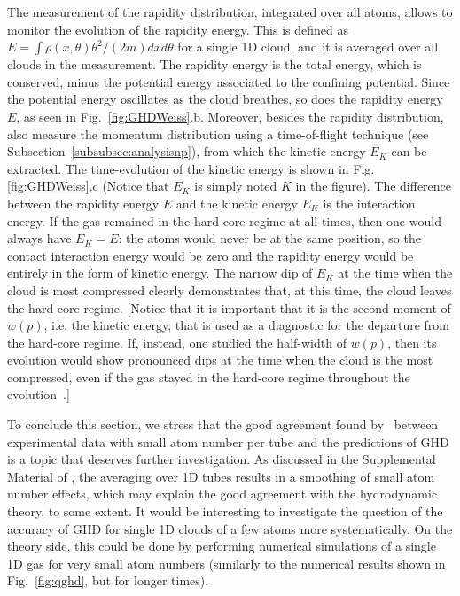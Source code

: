 \documentclass[onecolumn,amsfonts,showpacs,superscriptaddress]{revtex4-1}
\begin{document}
The measurement of the rapidity distribution, integrated over all atoms, allows to monitor the evolution of the rapidity energy. This is defined as $E= \int \rho(x,\theta) \theta^2/(2m) dx d\theta$ for a single 1D cloud, and it is averaged over all clouds in the measurement. The rapidity energy is the total energy, which is conserved, minus the potential energy associated to the confining potential. Since the potential energy oscillates as the cloud breathes, so does the rapidity energy $E$, as seen in Fig.~\ref{fig:GHDWeiss}.b.
Moreover, besides the rapidity distribution, \cite{malvania2020generalized} also measure the momentum distribution using a time-of-flight technique (see Subsection~\ref{subsubsec:analysisnp}), from which the kinetic energy $E_K$ can be extracted. The time-evolution of the kinetic energy is  shown in Fig.\ref{fig:GHDWeiss}.c %
(Notice that $E_K$ is simply noted $K$ in the figure).%
The difference between the rapidity energy $E$ and the kinetic energy $E_K$ is the interaction energy. If the gas remained in the hard-core regime at all times, then one would always have $E_K=E$: the atoms would never be at the same position, so the contact interaction energy would be zero and the rapidity energy would be entirely in the form of kinetic energy. The narrow dip of $E_K$ at the time when the cloud is most compressed clearly demonstrates that, at this time, the cloud leaves the hard core regime. [Notice that it is important that it is the second moment of $w(p)$, i.e. the kinetic energy, that is used as a diagnostic for the departure from the hard-core regime. If, instead, one studied the half-width of $w(p)$, then its evolution would show pronounced dips at the time when the cloud is the most compressed, even if the gas stayed in the hard-core regime throughout the evolution~\citep{atas_collective_2017}.]


To conclude this section, we stress that the good agreement found by~\citep{malvania2020generalized} between experimental data with small atom number per tube and the predictions of GHD is a topic that deserves further investigation. As discussed in the Supplemental Material of \citep{malvania2020generalized}, the averaging over 1D tubes results in a smoothing of small atom number effects, which may explain the good agreement with the hydrodynamic theory, to some extent. It would be interesting to investigate the question of the accuracy of GHD for single 1D clouds of a few atoms more systematically. On the theory side, this could be done by performing numerical simulations of a single 1D gas for very small atom numbers (similarly to the numerical results shown in Fig.~\ref{fig:qghd}, but for longer times).
\end{document}
